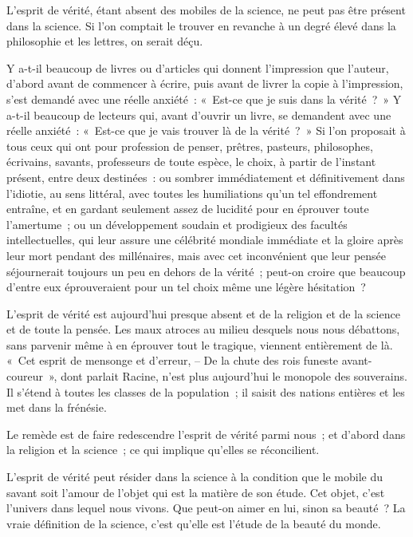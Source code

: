 \documentclass[french,twoside]{book} %
\begin{document}
L'esprit de vérité, étant absent des mobiles de la science, ne peut pas être présent dans la science. Si l'on comptait le trouver en revanche à un degré élevé dans la philosophie et les lettres, on serait déçu.\par
Y a-t-il beaucoup de livres ou d'articles qui donnent l'impression que l'auteur, d'abord avant de commencer à écrire, puis avant de livrer la copie à l'impression, s'est demandé avec une réelle anxiété : « Est-ce que je suis dans la vérité ? » Y a-t-il beaucoup de lecteurs qui, avant d'ouvrir un livre, se demandent avec une réelle anxiété : « Est-ce que je vais trouver là de la vérité ? » Si l'on proposait à tous ceux qui ont pour profession de penser, prêtres, pasteurs, philosophes, écrivains, savants, professeurs de toute espèce, le choix, à partir de l'instant présent, entre deux destinées : ou sombrer immédiatement et définitivement dans l'idiotie, au sens littéral, avec toutes les humiliations qu'un tel effondrement entraîne, et en gardant seulement assez de lucidité pour en éprouver toute l'amertume ; ou un développement soudain et prodigieux des facultés intellectuelles, qui leur assure une célébrité mondiale immédiate et la gloire après leur mort pendant des millénaires, mais avec cet inconvénient que leur pensée séjournerait toujours un peu en dehors de la vérité ; peut-on croire que beaucoup d'entre eux éprouveraient pour un tel choix même une légère hésitation ?\par
L'esprit de vérité est aujourd'hui presque absent et de la religion et de la science et de toute la pensée. Les maux atroces au milieu desquels nous nous débattons, sans parvenir même à en éprouver tout le tragique, viennent entièrement de là. « Cet esprit de mensonge et d'erreur, – De la chute des rois funeste avant-coureur », dont parlait Racine, n'est plus aujourd'hui le monopole des souverains. Il s'étend à toutes les classes de la population ; il saisit des nations entières et les met dans la frénésie.\par
Le remède est de faire redescendre l'esprit de vérité parmi nous ; et d'abord dans la religion et la science ; ce qui implique qu'elles se réconcilient.\par
L'esprit de vérité peut résider dans la science à la condition que le mobile du savant soit l'amour de l'objet qui est la matière de son étude. Cet objet, c'est l'univers dans lequel nous vivons. Que peut-on aimer en lui, sinon sa beauté ? La vraie définition de la science, c'est qu'elle est l'étude de la beauté du monde.\par
\end{document}
